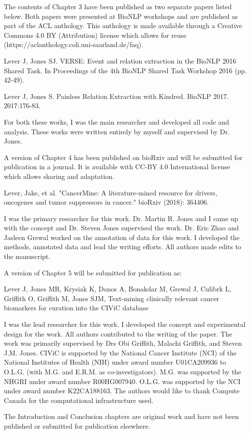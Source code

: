 The contents of Chapter 3 have been published as two separate papers listed below. Both papers were presented at BioNLP workshops and are published as part of the ACL anthology. This anthology is made available through a Creative Commons 4.0 BY (Attribution) license which allows for reuse (https://aclanthology.coli.uni-saarland.de/faq).

Lever J, Jones SJ. VERSE: Event and relation extraction in the BioNLP 2016 Shared Task. In Proceedings of the 4th BioNLP Shared Task Workshop 2016 (pp. 42-49).

Lever J, Jones S. Painless Relation Extraction with Kindred. BioNLP 2017. 2017:176-83.

For both these works, I was the main researcher and developed all code and analysis. These works were written entirely by myself and supervised by Dr. Jones.

A version of Chapter 4 has been published on bioRxiv and will be submitted for publication in a journal. It is available with CC-BY 4.0 International license which allows sharing and adaptation.

Lever, Jake, et al. "CancerMine: A literature-mined resource for drivers, oncogenes and tumor suppressors in cancer." bioRxiv (2018): 364406.

I was the primary researcher for this work. Dr. Martin R. Jones and I came up with the concept and Dr. Steven Jones supervised the work. Dr. Eric Zhao and Jasleen Grewal worked on the annotation of data for this work. I developed the methods, annotated data and lead the writing efforts. All authors made edits to the manuscript.

A version of Chapter 5 will be submitted for publication as:

Lever J, Jones MR, Krysiak K, Danos A, Bonakdar M, Grewal J, Culibrk L, Griffith O, Griffith M, Jones SJM, Text-mining clinically relevant cancer biomarkers for curation into the CIViC database

I was the lead researcher for this work. I developed the concept and experimental design for the work. All authors contributed to the writing of the paper. The work was primarily supervised by Drs Obi Griffith, Malachi Griffith, and Steven J.M. Jones. CIViC is supported by the National Cancer Institute (NCI) of the National Institutes of Health (NIH) under award number U01CA209936 to O.L.G. (with M.G. and E.R.M. as co-investigators). M.G. was supported by the NHGRI under award number R00HG007940. O.L.G. was supported by the NCI under award number K22CA188163. The authors would like to thank Compute Canada for the computational infrastructure used.

The Introduction and Conclusion chapters are original work and have not been published or submitted for publication elsewhere.


